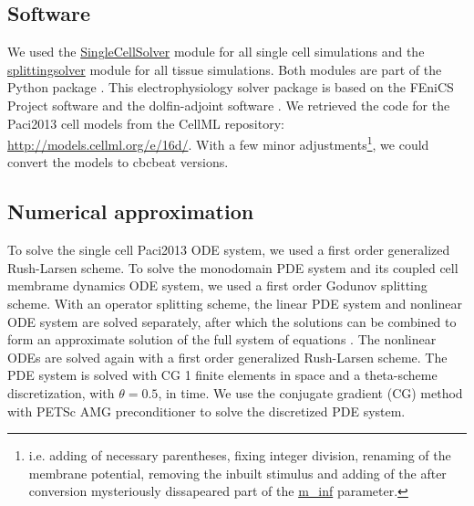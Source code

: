 \documentclass[12pt,a4paper]{article}
\begin{document}
\subsection{Software} \label{Software}
We used the \url{SingleCellSolver} module for all single cell simulations and the \url{splittingsolver} module for all tissue simulations. Both modules are part of the Python package \cite{cbcbeat}. This electrophysiology solver package is based on the FEniCS Project software \cite{fenics} and the dolfin-adjoint software \cite{dolfin-adjoint}. We retrieved the code for the Paci2013 cell models from the CellML repository: \url{http://models.cellml.org/e/16d/}. With a few minor adjustments\footnote{i.e. adding of necessary parentheses, fixing integer division, renaming of the membrane potential, removing the inbuilt stimulus and adding of the after conversion mysteriously dissapeared part of the \url{m_inf} parameter.}, we could convert the models to cbcbeat versions. 
%
\subsection{Numerical approximation} \label{Numerical approximation}
To solve the single cell Paci2013 ODE system, we used a first order generalized Rush-Larsen scheme. To solve the monodomain PDE system and its coupled cell membrame dynamics ODE system, we used a first order Godunov splitting scheme. With an operator splitting scheme, the linear PDE system and nonlinear ODE system are solved separately, after which the solutions can be combined to form an approximate solution of the full system of equations \cite{Sundnes}. The nonlinear ODEs are solved again with a first order generalized Rush-Larsen scheme. The PDE system is solved with CG 1 finite elements in space and a theta-scheme discretization, with $\theta=0.5$, in time. We use the conjugate gradient (CG) method with PETSc AMG preconditioner to solve the discretized PDE system.
%
\end{document}
